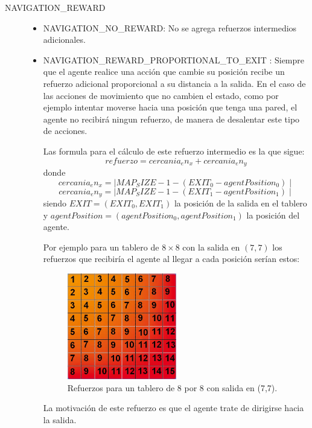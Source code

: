 \documentclass[a4paper,spanish] {article}
\begin{document}
\begin{description}
\item[NAVIGATION_REWARD] 
	\begin{itemize}
	\item NAVIGATION_NO_REWARD: No se agrega refuerzos intermedios adicionales.
	\item NAVIGATION_REWARD_PROPORTIONAL_TO_EXIT : Siempre que el agente realice una acción que cambie su posición recibe un refuerzo adicional proporcional a su distancia a la salida. En el caso de las acciones de movimiento que no cambien el estado, como por ejemplo intentar moverse hacia una posición que tenga una pared, el agente no recibirá ningun refuerzo, de manera de desalentar este tipo de acciones. 
	
	Las formula para el cálculo de este refuerzo intermedio es la que sigue:
	$$ refuerzo = cercania_en_x + cercania_en_y $$
	donde
	$$ cercania_en_x =\mid MAP_SIZE-1 -(EXIT_0 - agentPosition_0) \mid$$
	$$ cercania_en_y =\mid MAP_SIZE-1 -(EXIT_1 - agentPosition_1) \mid$$
	siendo $EXIT = (EXIT_0, EXIT_1)$ la posición de la salida en el tablero y $ agentPosition= (agentPosition_0, agentPosition_1)$ la posición del agente.
	
	Por ejemplo para un tablero de $8 \times 8$ con la salida en $(7,7)$ los refuerzos que recibiría el agente al llegar a cada posición serían estos:
	\begin{figure}[h!]
  \centering
    \includegraphics[width=0.5\textwidth]{refuerzos.jpg}
  \caption{Refuerzos para un tablero de 8 por 8 con salida en (7,7).}
	\end{figure}	
	La motivación de este refuerzo es que el agente trate de dirigirse hacia la salida.
	\end{itemize}


\end{description}
\end{document}
